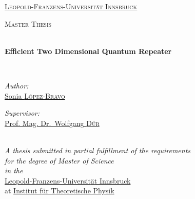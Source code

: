 \documentclass[10pt,a4paper]{book}
\numberwithin{equation}{chapter}
\numberwithin{figure}{chapter}
\numberwithin{table}{chapter}
\begin{document}
\frontmatter %

\pagestyle{plain} %

\begin{titlepage}

\begin{center}

\vspace*{.02\textheight}
{\scshape\LARGE \href{https://www.uibk.ac.at/}{Leopold-Franzens-Universit{\"a}t Innsbruck}\par}\vspace{1.0cm} %
\textsc{\Large Master Thesis}\\[0.5cm] %
\hline \\[0.4cm] %
{\huge \bfseries Efficient Two Dimensional Quantum Repeater \par}\vspace{0.4cm} %
\hline \\[1.5cm] %
 
\begin{minipage}[t]{0.4\textwidth}
\begin{flushleft} \large
\emph{Author:}\\
\href{https://www.uibk.ac.at/th-physik/staff/lopez-bravo/}{Sonia \textsc{López-Bravo}} %
\end{flushleft}
\end{minipage}
\begin{minipage}[t]{0.4\textwidth}
\begin{flushright} \large
\emph{Supervisor:} \\
\href{https://www.uibk.ac.at/th-physik/staff/duer/}{Prof. Mag. Dr.\ Wolfgang \textsc{Dür}} %
\end{flushright}
\end{minipage}\\[2cm]
 \large \textit{A thesis submitted in partial fulfillment of the requirements\\ for the degree of Master of Science}\\[0.3cm] %
\textit{in the}\\[0.4cm]
\href{https://www.uibk.ac.at/th-physik/research/quanteninformation/}{Leopold-Franzens-Universit{\"a}t Innsbruck}\\ at \href{https://www.uibk.ac.at/th-physik/}{Institut f{\"u}r Theoretische Physik}\\[1cm] %


\end{center}
\end{titlepage}
\end{document}
